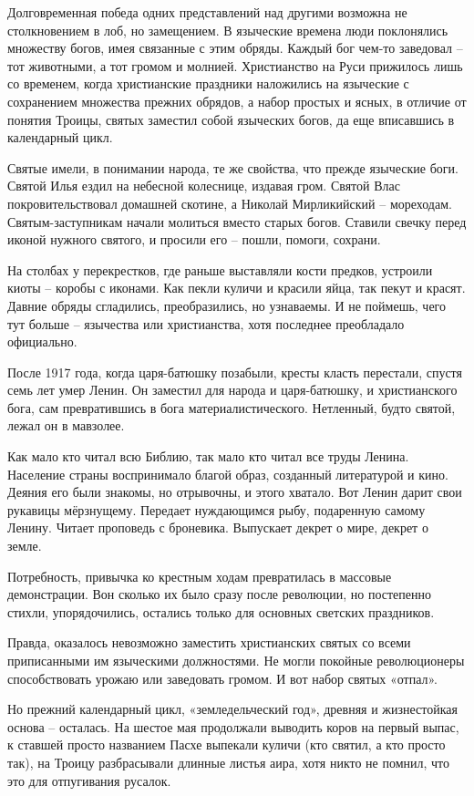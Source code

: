 Долговременная победа одних представлений над другими возможна не столкновением в лоб, но замещением. В языческие времена люди поклонялись множеству богов, имея связанные с этим обряды. Каждый бог чем-то заведовал – тот животными, а тот громом и молнией. Христианство на Руси прижилось лишь со временем, когда христианские праздники наложились на языческие с сохранением множества прежних обрядов, а набор простых и ясных, в отличие от понятия Троицы, святых заместил собой языческих богов, да еще вписавшись в календарный цикл. 

Святые имели, в понимании народа, те же свойства, что прежде языческие боги. Святой Илья ездил на небесной колеснице, издавая гром. Святой Влас покровительствовал домашней скотине, а Николай Мирликийский – мореходам. Святым-заступникам начали молиться вместо старых богов. Ставили свечку перед иконой нужного святого, и просили его – пошли, помоги, сохрани.

На столбах у перекрестков, где раньше выставляли кости предков, устроили киоты – коробы с иконами. Как пекли куличи и красили яйца, так пекут и красят. Давние обряды сгладились, преобразились, но узнаваемы. И не поймешь, чего тут больше – язычества или христианства, хотя последнее преобладало официально.

После 1917 года, когда царя-батюшку позабыли, кресты класть перестали, спустя семь лет умер Ленин. Он заместил для народа и царя-батюшку, и христианского бога, сам превратившись в бога материалистического. Нетленный, будто святой, лежал он в мавзолее.

Как мало кто читал всю Библию, так мало кто читал все труды Ленина. Население страны воспринимало благой образ, созданный литературой и кино. Деяния его были знакомы, но отрывочны, и этого хватало. Вот Ленин дарит свои рукавицы мёрзнущему. Передает нуждающимся рыбу, подаренную самому Ленину. Читает проповедь с броневика. Выпускает декрет о мире, декрет о земле.

Потребность, привычка ко крестным ходам превратилась в массовые демонстрации. Вон сколько их было сразу после революции, но постепенно стихли, упорядочились, остались только для основных светских праздников.

Правда, оказалось невозможно заместить христианских святых со всеми приписанными им языческими должностями. Не могли покойные революционеры способствовать урожаю или заведовать громом. И вот набор святых «отпал».

Но прежний календарный цикл, «земледельческий год», древняя и жизнестойкая основа – осталась. На шестое мая продолжали выводить коров на первый выпас, к ставшей просто названием Пасхе выпекали куличи (кто святил, а кто просто так), на Троицу разбрасывали длинные листья аира, хотя никто не помнил, что это для отпугивания русалок.

